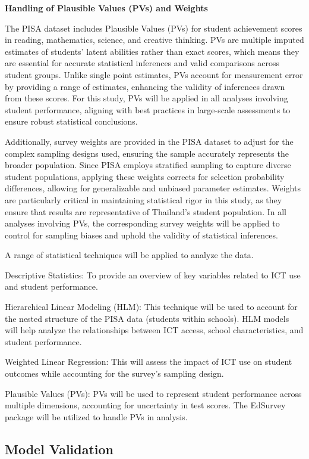 \documentclass[
]{article}
\begin{document}
\textbf{Handling of Plausible Values (PVs) and Weights}

The PISA dataset includes Plausible Values (PVs) for student achievement
scores in reading, mathematics, science, and creative thinking. PVs are
multiple imputed estimates of students' latent abilities rather than
exact scores, which means they are essential for accurate statistical
inferences and valid comparisons across student groups. Unlike single
point estimates, PVs account for measurement error by providing a range
of estimates, enhancing the validity of inferences drawn from these
scores. For this study, PVs will be applied in all analyses involving
student performance, aligning with best practices in large-scale
assessments to ensure robust statistical conclusions.

Additionally, survey weights are provided in the PISA dataset to adjust
for the complex sampling designs used, ensuring the sample accurately
represents the broader population. Since PISA employs stratified
sampling to capture diverse student populations, applying these weights
corrects for selection probability differences, allowing for
generalizable and unbiased parameter estimates. Weights are particularly
critical in maintaining statistical rigor in this study, as they ensure
that results are representative of Thailand's student population. In all
analyses involving PVs, the corresponding survey weights will be applied
to control for sampling biases and uphold the validity of statistical
inferences.

A range of statistical techniques will be applied to analyze the data.

Descriptive Statistics: To provide an overview of key variables related
to ICT use and student performance.

Hierarchical Linear Modeling (HLM): This technique will be used to
account for the nested structure of the PISA data (students within
schools). HLM models will help analyze the relationships between ICT
access, school characteristics, and student performance.

Weighted Linear Regression: This will assess the impact of ICT use on
student outcomes while accounting for the survey's sampling design.

Plausible Values (PVs): PVs will be used to represent student
performance across multiple dimensions, accounting for uncertainty in
test scores. The EdSurvey package will be utilized to handle PVs in
analysis.

\hypertarget{model-validation}{%
\subsection{Model Validation}\label{model-validation}}
\end{document}
